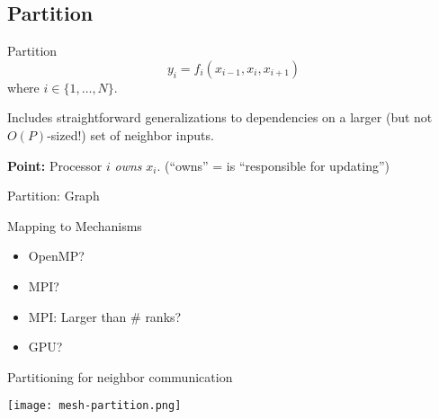 \documentclass[english,compress]{beamer}
\begin{document}
\subsection{Partition}
\begin{frame}{Partition}
  {\Huge
  \[
    y_i = f_i(x_{i-1}, x_i, x_{i+1})
  \]}
  where $i\in\{1,\dots,N\}$.

  \pause
  \bigskip
  Includes straightforward
  generalizations to dependencies on a larger (but
  not $O(P)$-sized!) set of neighbor inputs.

  \pause
  \bigskip
  \textbf{Point:} Processor $i$ \emph{owns} $x_i$. (``owns'' = is
  ``responsible for updating'')
\end{frame}
\begin{frame}{Partition: Graph}
  \begin{center}
  \end{center}
\end{frame}
\begin{frame}{Mapping to Mechanisms}
  \begin{itemize}[<+->]
    \item OpenMP?
    \item MPI?
    \item MPI: Larger than \# ranks?
    \item GPU?
  \end{itemize}
\end{frame}
\begin{frame}{Partitioning for neighbor communication}
  \begin{center}
    \texttt{[image: mesh-partition.png]}
  \end{center}
  \uncover<+>{}
\end{frame}
\end{document}
